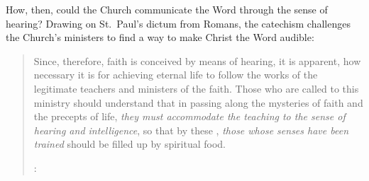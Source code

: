How, then, could the Church communicate the Word through the sense of hearing?
Drawing on St.\ Paul's dictum from Romans, the catechism challenges the Church's ministers to find a way to make Christ the Word audible:
\begin{quote}
    Since, therefore, faith is conceived by means of hearing, it is apparent, how necessary it is for achieving eternal life to follow the works of the legitimate teachers and ministers of the faith. \Dots{}
    Those who are called to this ministry should understand that in passing along the mysteries of faith and the precepts of life, \emph{they must accommodate the teaching to the sense of hearing and intelligence}, so that by these , \emph{those whose senses have been trained} should be filled up by spiritual food.%
    \begin{Footnote}
        \Autocite[2, 8--9 (emphasis added)]{Catholic:Catechismus1614}: 
    \end{Footnote}
\end{quote}

